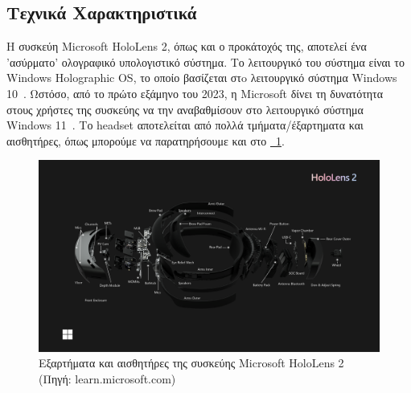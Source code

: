 \subsection{Τεχνικά Χαρακτηριστικά}\label{subsec:hololensSpecs}
Η συσκεύη Microsoft HoloLens 2, όπως και ο προκάτοχός της, αποτελεί ένα 'ασύρματο' ολογραφικό υπολογιστικό σύστημα. Το λειτουργικό του σύστημα είναι το Windows Holographic OS, το οποίο βασίζεται στo λειτουργικό σύστημα Windows 10~\cite{scooley_2023_hololens}. Ωστόσο, από το πρώτο εξάμηνο του 2023, η Microsoft δίνει τη δυνατότητα στους χρήστες της συσκεύης να την αναβαθμίσουν στο λειτουργικό σύστημα Windows 11~\cite{seiler_2023_microsoft}. Το headset αποτελείται από πολλά τμήματα/έξαρτηματα και αισθητήρες, όπως μπορούμε να παρατηρήσουμε και στο \hyperref[fig:hololensDeviceParts]{\schema~\ref*{fig:hololensDeviceParts}}.
\begin{figure}[!ht]
    \centering
    \includegraphics[width=130mm]{images/microsoft_hololens_2_parts2.png}
    \caption{Εξαρτήματα και αισθητήρες της συσκεύης Microsoft HoloLens 2 {\footnotesize (Πηγή: learn.microsoft.com)}}\label{fig:hololensDeviceParts}
\end{figure}

